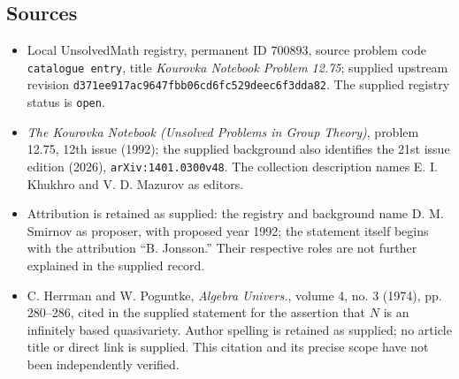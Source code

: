 \documentclass[11pt]{article}
\begin{document}
\subsection{Sources}
\begin{itemize}
\item Local UnsolvedMath registry, permanent ID \(700893\), source problem code \texttt{catalogue entry}, title \emph{Kourovka Notebook Problem 12.75}; supplied upstream revision \texttt{d371ee917ac9647fbb06cd6fc529deec6f3dda82}. The supplied registry status is \texttt{open}.
\item \emph{The Kourovka Notebook (Unsolved Problems in Group Theory)}, problem 12.75, 12th issue (1992); the supplied background also identifies the 21st issue edition (2026), \texttt{arXiv:1401.0300v48}. The collection description names E. I. Khukhro and V. D. Mazurov as editors.
\item Attribution is retained as supplied: the registry and background name D. M. Smirnov as proposer, with proposed year 1992; the statement itself begins with the attribution ``B. Jonsson.'' Their respective roles are not further explained in the supplied record.
\item C. Herrman and W. Poguntke, \emph{Algebra Univers.}, volume 4, no. 3 (1974), pp. 280--286, cited in the supplied statement for the assertion that \(N\) is an infinitely based quasivariety. Author spelling is retained as supplied; no article title or direct link is supplied. This citation and its precise scope have not been independently verified.
\end{itemize}
\end{document}
